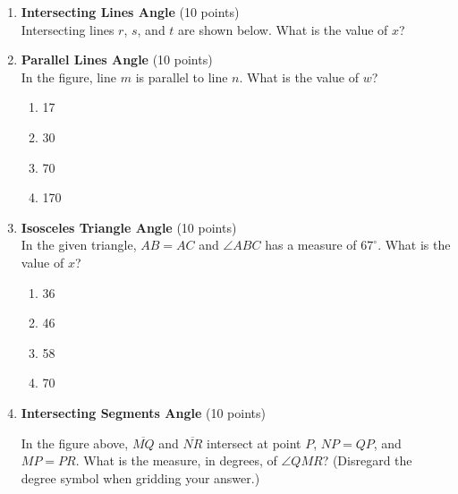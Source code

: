 \begin{enumerate}
  \newpage

  \item \textbf{Intersecting Lines Angle} (10 points)\\
  Intersecting lines $r$, $s$, and $t$ are shown below.
  What is the value of $x$?
  \begin{subanswer}
  \end{subanswer}

  \item \textbf{Parallel Lines Angle} (10 points)\\
  In the figure, line $m$ is parallel to line $n$. What is the value of $w$?
  \begin{enumerate}[label=(\Alph*)]
    \item 17
    \item 30
    \item 70
    \item 170
  \end{enumerate}
  \begin{subanswer}
  \end{subanswer}

  \newpage

  \item \textbf{Isosceles Triangle Angle} (10 points)\\
  In the given triangle, $AB=AC$ and $\angle ABC$ has a measure of $67^{\circ}$. What is the value of $x$?
  \begin{enumerate}[label=(\Alph*)]
    \item 36
    \item 46
    \item 58
    \item 70
  \end{enumerate}
  \begin{subanswer}
  \end{subanswer}

  \item \textbf{Intersecting Segments Angle} (10 points)\\
  
  In the figure above, $\overline{MQ}$ and $\overline{NR}$ intersect at point $P$, $NP=QP$, and $MP=PR$. What is the measure, in degrees, of $\angle QMR$? (Disregard the degree symbol when gridding your answer.)
  \begin{subanswer}
  \end{subanswer}



\end{enumerate}

